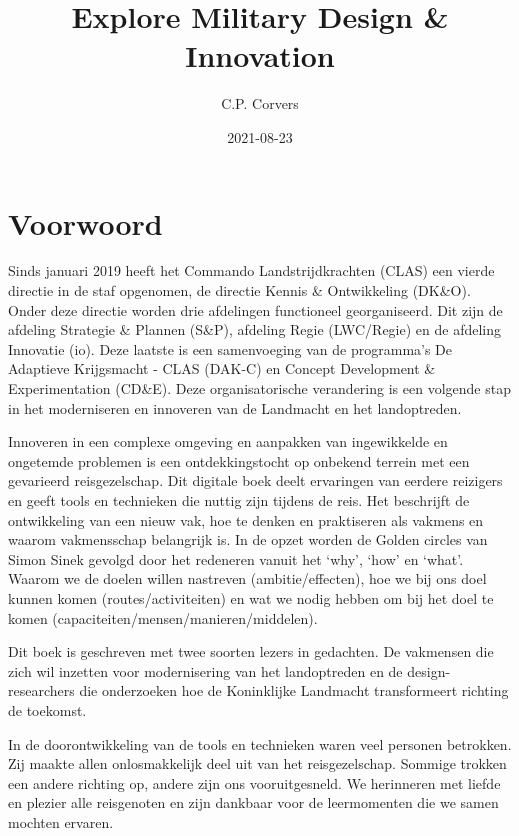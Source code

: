 \documentclass[
]{book}
\title{Explore Military Design \& Innovation}
\author{C.P. Corvers}
\date{2021-08-23}
\begin{document}
\maketitle

{
\setcounter{tocdepth}{1}
\tableofcontents
}
\hypertarget{voorwoord}{%
\chapter*{Voorwoord}\label{voorwoord}}

Sinds januari 2019 heeft het Commando Landstrijdkrachten (CLAS) een vierde directie in de staf opgenomen, de directie Kennis \& Ontwikkeling (DK\&O). Onder deze directie worden drie afdelingen functioneel georganiseerd. Dit zijn de afdeling Strategie \& Plannen (S\&P), afdeling Regie (LWC/Regie) en de afdeling Innovatie (io). Deze laatste is een samenvoeging van de programma's De Adaptieve Krijgsmacht - CLAS (DAK-C) en Concept Development \& Experimentation (CD\&E). Deze organisatorische verandering is een volgende stap in het moderniseren en innoveren van de Landmacht en het landoptreden.

Innoveren in een complexe omgeving en aanpakken van ingewikkelde en ongetemde problemen is een ontdekkingstocht op onbekend terrein met een gevarieerd reisgezelschap. Dit digitale boek deelt ervaringen van eerdere reizigers en geeft tools en technieken die nuttig zijn tijdens de reis. Het beschrijft de ontwikkeling van een nieuw vak, hoe te denken en praktiseren als vakmens en waarom vakmensschap belangrijk is. In de opzet worden de Golden circles van Simon Sinek gevolgd door het redeneren vanuit het `why', `how' en `what'. Waarom we de doelen willen nastreven (ambitie/effecten), hoe we bij ons doel kunnen komen (routes/activiteiten) en wat we nodig hebben om bij het doel te komen (capaciteiten/mensen/manieren/middelen).

Dit boek is geschreven met twee soorten lezers in gedachten. De vakmensen die zich wil inzetten voor modernisering van het landoptreden en de design-researchers die onderzoeken hoe de Koninklijke Landmacht transformeert richting de toekomst.

In de doorontwikkeling van de tools en technieken waren veel personen betrokken. Zij maakte allen onlosmakkelijk deel uit van het reisgezelschap. Sommige trokken een andere richting op, andere zijn ons vooruitgesneld. We herinneren met liefde en plezier alle reisgenoten en zijn dankbaar voor de leermomenten die we samen mochten ervaren.
\end{document}
